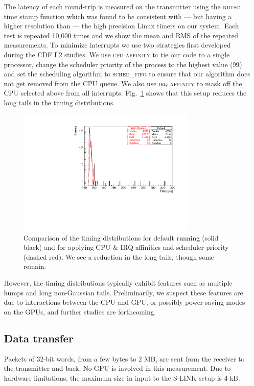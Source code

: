 \documentclass[journal]{IEEEtran}
\begin{document}
The latency of each round-trip is measured on the transmitter using
the \textsc{rdtsc} time stamp function 
which was found to be consistent with --- but having a higher resolution than --- the high precision Linux timers on our system. 
Each test is repeated 10,000
times and we show the mean and RMS of the repeated measurements. 
To minimize interrupts we use two strategies first developed during the
CDF L2 studies. We use \textsc{cpu affinity} to tie our code to a
single processor, change the scheduler priority of the process to the
highest value (99) and set the scheduling algorithm to
\textsc{sched\_fifo} to ensure that our algorithm does not get removed
from the CPU queue. We also use \textsc{irq affinity} to mask off the
CPU selected above from all interrupts. Fig.~\ref{fig:affinity} shows that 
this setup reduces the long tails in the timing distributions.
\begin{figure}[tbp]
\centering
\includegraphics[width=3.5in]{figures/affinity_32_20121017_irqaffinity}
\caption{Comparison of the timing distributions for default running (solid black)
and for applying CPU \& IRQ affinities and scheduler priority (dashed
red). We see a reduction in the long tails, though some remain. }
\label{fig:affinity}
\end{figure}
However, the timing distributions typically exhibit features such as
multiple humps and long non-Gaussian tails. Preliminarily, we suspect
these features are due to interactions between the CPU and GPU, or
possibly power-saving modes on the GPUs, and further studies are
forthcoming.

\subsection{Data transfer}
Packets of 32-bit words, from a few bytes to 2 MB, are sent from the receiver
to the transmitter and back. No GPU is involved in this measurement.
Due to hardware limitations, the maximum size in input to the S-LINK 
setup is 4 kB.
 
\end{document}
